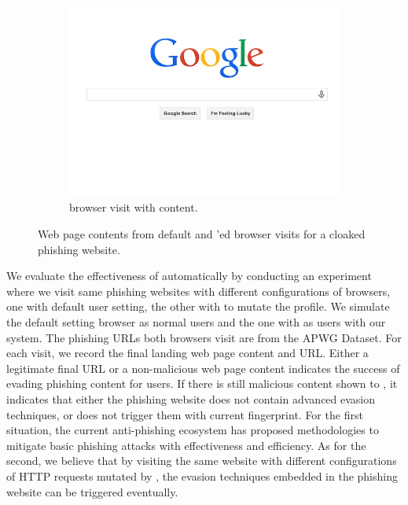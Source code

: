 \begin{figure}
	\quad
	\begin{subfigure}[tb]{.31\textwidth}
		\includegraphics[width=\linewidth]{figs/netflix_sp2.png}
        \caption{\spartacus browser visit with content.}
        \label{fig:sp2}
	\end{subfigure}%
	\quad
	\caption{Web page contents from default and \spartacus'ed browser visits for a cloaked phishing website.}
	\label{fig:effectiveness}
\end{figure}

We evaluate the effectiveness of \spartacus automatically by conducting an experiment where we visit same phishing websites with different configurations of browsers, one with default user setting, the other with \spartacus to mutate the profile.
We simulate the default setting browser as normal users and the one with \spartacus as users with our system.
The phishing URLs both browsers visit are from the APWG Dataset.
For each visit, we record the final landing web page content and URL.
Either a legitimate final URL or a non-malicious web page content indicates the success of \spartacus evading phishing content for users.
If there is still malicious content shown to \spartacus, it indicates that either the phishing website does not contain advanced evasion techniques, or \spartacus does not trigger them with current fingerprint.
For the first situation, the current anti-phishing ecosystem has proposed methodologies to mitigate basic phishing attacks with effectiveness and efficiency.
As for the second, we believe that by visiting the same website with different configurations of HTTP requests mutated by \spartacus, the evasion techniques embedded in the phishing website can be triggered eventually. 

